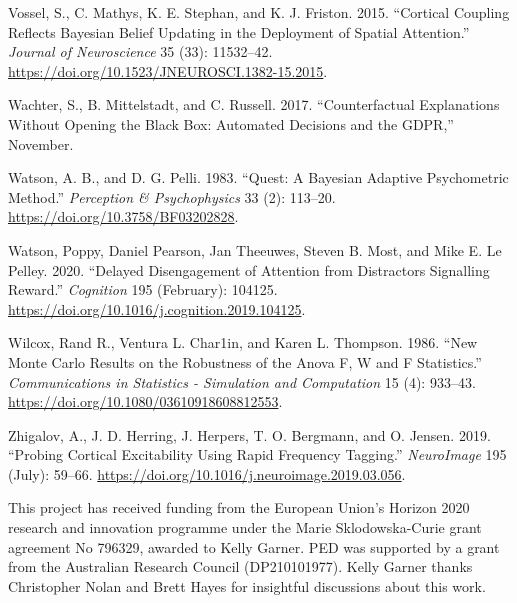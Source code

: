 \documentclass[11pt,halfline,a4paper,]{ouparticle}
\newlength{\cslhangindent}
\newenvironment{cslreferences}%
  {\setlength{\parindent}{0pt}%
  \everypar{\setlength{\hangindent}{\cslhangindent}}\ignorespaces}%
  {\par}
\begin{document}
\begin{cslreferences}
\leavevmode\hypertarget{ref-vosselCorticalCouplingReflects2015}{}%
Vossel, S., C. Mathys, K. E. Stephan, and K. J. Friston. 2015. ``Cortical Coupling Reflects Bayesian Belief Updating in the Deployment of Spatial Attention.'' \emph{Journal of Neuroscience} 35 (33): 11532--42. \url{https://doi.org/10.1523/JNEUROSCI.1382-15.2015}.

\leavevmode\hypertarget{ref-wachterCounterfactualExplanationsOpening2017}{}%
Wachter, S., B. Mittelstadt, and C. Russell. 2017. ``Counterfactual Explanations Without Opening the Black Box: Automated Decisions and the GDPR,'' November.

\leavevmode\hypertarget{ref-watsonQuestBayesianAdaptive1983}{}%
Watson, A. B., and D. G. Pelli. 1983. ``Quest: A Bayesian Adaptive Psychometric Method.'' \emph{Perception \& Psychophysics} 33 (2): 113--20. \url{https://doi.org/10.3758/BF03202828}.

\leavevmode\hypertarget{ref-watsonDelayedDisengagementAttention2020}{}%
Watson, Poppy, Daniel Pearson, Jan Theeuwes, Steven B. Most, and Mike E. Le Pelley. 2020. ``Delayed Disengagement of Attention from Distractors Signalling Reward.'' \emph{Cognition} 195 (February): 104125. \url{https://doi.org/10.1016/j.cognition.2019.104125}.

\leavevmode\hypertarget{ref-wilcoxNewMonteCarlo1986}{}%
Wilcox, Rand R., Ventura L. Char1in, and Karen L. Thompson. 1986. ``New Monte Carlo Results on the Robustness of the Anova F, W and F Statistics.'' \emph{Communications in Statistics - Simulation and Computation} 15 (4): 933--43. \url{https://doi.org/10.1080/03610918608812553}.

\leavevmode\hypertarget{ref-zhigalovProbingCorticalExcitability2019}{}%
Zhigalov, A., J. D. Herring, J. Herpers, T. O. Bergmann, and O. Jensen. 2019. ``Probing Cortical Excitability Using Rapid Frequency Tagging.'' \emph{NeuroImage} 195 (July): 59--66. \url{https://doi.org/10.1016/j.neuroimage.2019.03.056}.
\end{cslreferences}


\begin{notes}[Acknowledgements]
This project has received funding from the European Union's Horizon 2020 research and innovation programme under the Marie Sklodowska-Curie grant agreement No 796329, awarded to Kelly Garner. PED was supported by a grant from the Australian Research Council (DP210101977). Kelly Garner thanks Christopher Nolan and Brett Hayes for insightful discussions about this work.
\end{notes}
\end{document}
